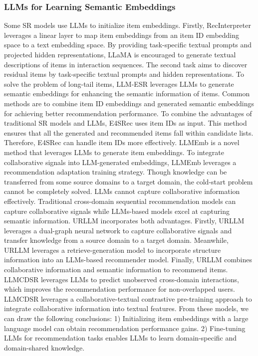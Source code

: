 \documentclass[review]{fcs}
\begin{document}
	\subsubsection{LLMs for Learning Semantic Embeddings}
	Some SR models use LLMs to initialize item embeddings. Firstly, RecInterpreter \cite{RecInterpreter} leverages a linear layer to map item embeddings from an item ID embedding space to a text embedding space. By providing task-specific textual prompts and projected hidden representations, LLaMA is encouraged to generate textual descriptions of items in interaction sequences. The second task aims to discover residual items by task-specific textual prompts and hidden representations. To solve the problem of long-tail items, LLM-ESR \cite{LLM-ESR} leverages LLMs to generate semantic embeddings for enhancing the semantic information of items. Common methods are to combine item ID embeddings and generated semantic embeddings for achieving better recommendation performance. To combine the advantages of traditional SR models and LLMs, E4SRec \cite{E4SRec} uses item IDs as input. This method ensures that all the generated and recommended items fall within candidate lists. Therefore, E4SRec can handle item IDs more effectively. LLMEmb \cite{LLMEmb} is a novel method that leverages LLMs to generate item embeddings. To integrate collaborative signals into LLM-generated embeddings, LLMEmb leverages a recommendation adaptation training strategy. Though knowledge can be transferred from some source domains to a target domain, the cold-start problem cannot be completely solved. LLMs cannot capture collaborative information effectively. Traditional cross-domain sequential recommendation models can capture collaborative signals while LLMs-based models excel at capturing semantic information. URLLM \cite{URLLM} incorporates both advantages. Firstly, URLLM leverages a dual-graph neural network to capture collaborative signals and transfer knowledge from a source domain to a target domain. Meanwhile, URLLM leverages a retrieve-generation model to incorporate structure information into an LLMs-based recommender model. Finally, URLLM combines collaborative information and semantic information to recommend items. LLMCDSR \cite{LLMCDSR} leverages LLMs to predict unobserved cross-domain interactions, which improves the recommendation performance for non-overlapped users. LLMCDSR \cite{LLMCDSR} leverages a collaborative-textual contrastive pre-training approach to integrate collaborative information into textual features. From these models, we can draw the following conclusions: 1) Initializing item embeddings with a large language model can obtain recommendation performance gains. 2) Fine-tuning LLMs for recommendation tasks enables LLMs to learn domain-specific and domain-shared knowledge.
	
\end{document}
